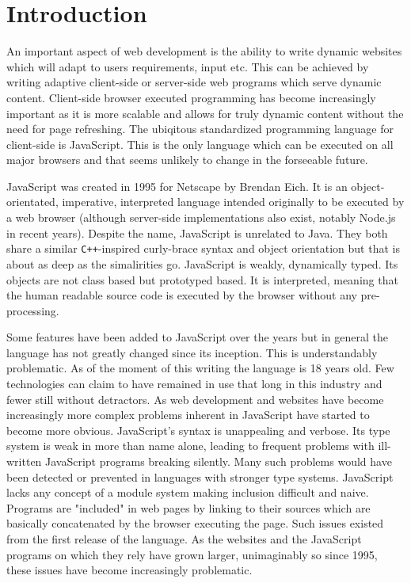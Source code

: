 
\section{Introduction}
An important aspect of web development is the ability to write dynamic
websites which will adapt to users requirements, input etc. This can be
achieved by writing adaptive client-side or server-side web programs
which serve dynamic content. Client-side browser executed programming 
has become  increasingly important as it is more scalable and allows 
for truly dynamic content without the need for page refreshing. The 
ubiqitous standardized programming language for client-side is JavaScript.
This is the only language which can be executed on all major browsers and 
that seems unlikely to change in the forseeable future. 

JavaScript was created in 1995 for Netscape by Brendan Eich. It is an
object-orientated, imperative, interpreted language intended originally
to be executed by a web browser (although server-side implementations
also exist, notably Node.js in recent years). Despite the name, JavaScript
is unrelated to Java. They both share a similar \verb!C++!-inspired
curly-brace syntax and object orientation but that is about as deep as
the simalirities go. JavaScript is weakly, dynamically typed. Its objects
are not class based but prototyped based. It is interpreted, meaning
that the human readable source code is executed by the browser without
any pre-processing. 

Some features have been added to JavaScript over the years but in 
general the language has not greatly changed since its inception. This
is understandably problematic. As of the moment of this writing the
language is 18 years old. Few technologies can claim to have remained
in use that long in this industry and fewer still without detractors.
As web development and websites have become increasingly more complex
problems inherent in JavaScript have started to become more obvious.
JavaScript's syntax is unappealing and verbose. Its type system is 
weak in more than name alone, leading to frequent problems with ill-
written JavaScript programs breaking silently. Many such problems 
would have been detected or prevented in languages with stronger
type systems. JavaScript lacks any concept of a module system making
inclusion difficult and naive. Programs are "included" in web pages
by linking to their sources which are basically concatenated by the
browser executing the page. Such issues existed from the first 
release of the language. As the websites and the JavaScript
programs on which they rely have grown larger, unimaginably so since
1995, these issues have become increasingly problematic.

